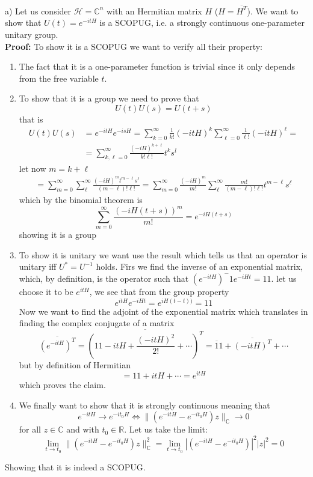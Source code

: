 \documentclass{article}
\newcommand{\R}{\mathbb{R}}
\newcommand{\C}{\mathbb C}
\newcommand{\1}{1\!\!1}
\newcommand{\proof}{\\ \textbf{Proof: }}
\begin{document}
a) Let us consider $\mathcal H = \C^n$ with an Hermitian matrix $H$ ($H = \overline{H^T}$). We want to show that $U(t) = e^{-itH}$ is a SCOPUG, i.e. a strongly continuous one-parameter unitary group.
\proof To show it is a SCOPUG we want to verify all their property:
\begin{enumerate} [label = \roman*)]
    \item The fact that it is a one-parameter function is trivial since it only depends from the free variable $t$.
    \item To show that it is a group we need to prove that 
    \[
        U(t)U(s) = U(t+s)
    \]
    that is
    \[
        \begin{split}
            U(t)U(s) &= e^{-itH}e^{-isH} = \sum_{k= 0}^\infty \frac{1}{k!} {(-itH)}^k \sum_{\ell= 0}^\infty \frac{1}{\ell!} {(-itH)}^\ell = \\
            & = \sum_{k, \ell = 0}^\infty \frac{(-iH)^{k+\ell}}{k!\ell!} t^k s^l
        \end{split}
    \]
    let now $m = k + \ell$
    \[
        \begin{split}
            = \sum_{m=0}^\infty \sum_{\ell}^\infty \frac{{(-iH)}^m t^{m-\ell} s^\ell}{(m-\ell)! \ell!} = \sum_{m=0}^\infty \frac{{(-iH)}^m}{m!} \sum_{\ell}^\infty \frac{ m!}{(m-\ell)! \ell!}t^{m-\ell} s^\ell
        \end{split}
    \]
    which by the binomial theorem is
    \[
        \sum_{m=0}^\infty \frac{(-iH(t+s))^m}{m!} = e^{-iH(t+s)}
    \]
    showing it is a group
    \item To show it is unitary we want use the result which tells us that an operator is unitary iff $U^* = U^{-1}$ holds. Firs we find the inverse of an exponential matrix, which, by definition, is the operator such that ${(e^{-itH})}^-1 e^{-iHt} = \1$. let us choose it to be $e^{itH}$, we see that from the group property
    \[
        e^{itH} e^{-iHt} = e^{iH(t-t))} = \1
    \]
    Now we want to find the adjoint of the exponential matrix which translates in finding the complex conjugate of a matrix
    \[
        \overline{(e^{-itH})^T} = \overline{\left(\1 - itH + \frac{(-itH)^2}{2!} + \cdots \right)^T} = \overline \1 + \overline{(-itH)^T} + \cdots
    \]
    but by definition of Hermitian
    \[
        = \1 + itH + \cdots = e^{itH}
    \]
    which proves the claim.
    \item We finally want to show that it is strongly continuous meaning that
    \[
        e^{-itH} \to e^{-it_0 H} \iff \| ( e^{-itH} - e^{-it_0 H} )z \|_{\C} \to 0
    \]
    for all $z \in \C$ and with $t_0 \in \R$. Let us take the limit:
    \[
        \lim_{t \to t_0} \| ( e^{-itH} - e^{-it_0 H} )z \|_{\C}^2 = \lim_{t \to t_0} | ( e^{-itH} - e^{-it_0 H} )|^2 |z|^2 = 0
    \]
\end{enumerate}
Showing that it is indeed a SCOPUG.
\end{document}
